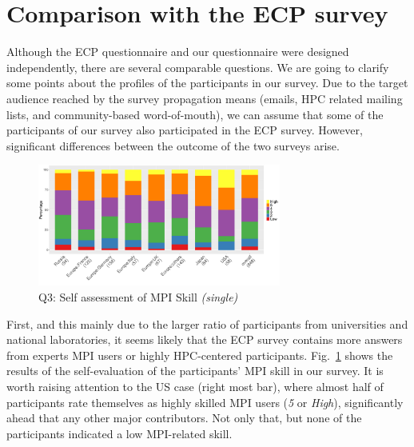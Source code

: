 \documentclass[preprint,5p,times]{elsarticle}
\def\myquote#1{{\it #1}}
\newcommand{\revision}[2]{{\color{blue}#2}}
\def\mcountries{major contributors\xspace{}}%
\begin{document}
\section{Comparison with the ECP survey}\label{sec:ecp}

Although the ECP questionnaire and our questionnaire were designed
independently, there are several comparable
questions. \revision{Before going into the details, we need}{We are
  going} to clarify some points about the profiles of the participants 
in our survey.
%
Due to the target audience reached by the survey propagation means (emails, HPC
related mailing lists, and \revision{community based word-of-the-mouth}{community-based word-of-mouth)}, we can assume
that some of the participants of our survey also participated in the ECP survey.
However, significant differences between the outcome of the two surveys arise.

\begin{figure}[tb]
  \begin{center}
    \includegraphics[width=8.0cm]{R-scripts/Q3.pdf}
    \vspace{-2mm}
    \caption{Q3: Self assessment of MPI Skill {\it(single)}}
    \label{fig:mpi-skill}
  \end{center}
\end{figure}

First, and this mainly due to the larger ratio of participants from universities
and national laboratories, it seems likely that the ECP survey contains more
answers from \revision{highly HPC-centered participants or experts MPI
  users}{experts MPI users or highly HPC-centered participants}. 
Fig.~\ref{fig:mpi-skill} shows the results of \revision{}{the} self-evaluation of the
\revision{participants}{participants'} MPI skill in our survey.  It is worth raising attention to the US
case (right most bar), where almost half of participants rate themselves as
highly skilled MPI users (\myquote{5} or \myquote{High}), significantly ahead
that any other \mcountries. Not only that, but none of the participants
indicated a low MPI-related skill.
\end{document}

